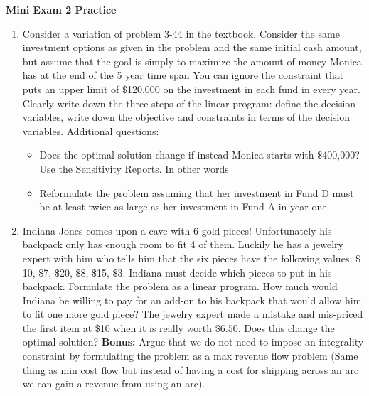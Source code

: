 \documentclass{article}[11 pt]    %
\begin{document}
\begin{center}
\textbf{Mini Exam 2 Practice}\\[.1cm]
\end{center}

\begin{enumerate}
\item Consider a variation of problem 3-44 in the textbook.  Consider the same investment options as given in the problem and the same initial cash amount, but assume that the goal is simply to maximize the amount of money Monica has at the end of the 5 year time span  You can ignore the constraint that puts an upper limit of $\$$120,000 on the investment in each fund in every year.  Clearly write down the three steps of the linear program: define the decision variables, write down the objective and constraints in terms of the decision variables.
Additional questions:
\begin{itemize}
\item Does the optimal solution change if instead Monica starts with $\$$400,000? Use the Sensitivity Reports.  In other words
\item Reformulate the problem assuming that her investment in Fund D must be at least twice as large as her investment in Fund A in year one.
\end{itemize}
\item Indiana Jones comes upon a cave with 6 gold pieces!  Unfortunately his backpack only has enough room to fit 4 of them.  Luckily he has a jewelry expert with him who tells him that the six pieces have the following values: $\$$10, $\$$7, $\$$20, $\$$8, $\$$15, $\$$3.  Indiana must decide which pieces to put in his backpack.  Formulate the problem as a linear program. How much would Indiana be willing to pay for an add-on to his backpack that would allow him to fit one more gold piece?  The jewelry expert made a mistake and mis-priced the first item at $\$$10 when it is really worth $\$6.50$.  Does this change the optimal solution? \textbf{Bonus:} Argue that we do not need to impose an integrality constraint by formulating the problem as a max revenue flow problem (Same thing as min cost flow but instead of having a cost for shipping across an arc we can gain a revenue from using an arc). 
\end{enumerate}
\end{document}
